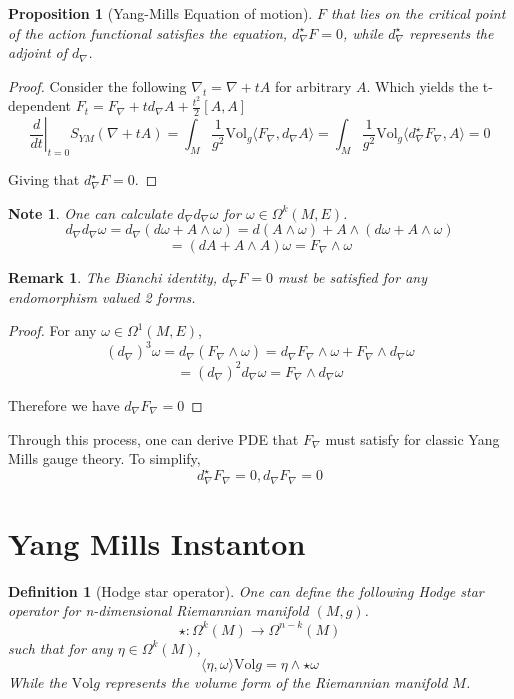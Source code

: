 \documentclass{article}
\newtheorem{defn}{Definition}
\newtheorem{prop}{Proposition}
\newtheorem{rem}{Remark}
\newtheorem{note}{Note}
\begin{document}
\begin{prop}[Yang-Mills Equation of motion]
     $F$ that lies on the critical point of the action functional satisfies the equation, $d_\nabla^{\star}F=0$, while $d_\nabla^\star$ represents the adjoint of $d_\nabla$. 
\end{prop}
\begin{proof}  
    Consider the following $\nabla_t = \nabla + tA$ for arbitrary $A$. Which yields the t-dependent $F_t = F_\nabla + t d_\nabla A + \frac{t^2}{2} [A,A]$
    \[
        \left. \frac{d}{dt} \right|_{t=0}  S_{YM}(\nabla+tA) = \int_M \frac{1}{g^2} \mathrm{Vol}_g \langle F_\nabla, d_\nabla A\rangle = \int_M \frac{1}{g^2} \mathrm{Vol}_g \langle d_\nabla ^\star F_\nabla, A\rangle =0
    \]

    Giving that $d_\nabla ^\star F = 0$.
\end{proof}


\begin{note}
    One can calculate $d_\nabla d_\nabla \omega$ for $\omega\in\Omega^k(M,E)$.
    \[
        d_\nabla d_\nabla\omega = d_\nabla(d\omega+A\wedge\omega) = d(A\wedge\omega)+A\wedge(d\omega + A\wedge\omega)
    \]
    \[
        =(dA+A\wedge A)\omega = F_\nabla \wedge \omega
    \]
\end{note}


\begin{rem}
    The Bianchi identity, $d_\nabla F = 0$ must be satisfied for any endomorphism valued 2 forms. 
\end{rem}
\begin{proof}
    For any $\omega\in\Omega^1(M,E)$,
    \[
    (d_\nabla)^3\omega = d_\nabla(F_\nabla\wedge\omega) = d_\nabla F_\nabla\wedge\omega + F_\nabla \wedge d_\nabla\omega
    \]
    \[
        =(d_\nabla)^2 d_\nabla\omega = F_\nabla \wedge d_\nabla \omega
    \]

    Therefore we have $d_\nabla F_\nabla=0$
\end{proof}

Through this process, one can derive PDE that $F_\nabla$ must satisfy for classic Yang Mills gauge theory. To simplify, 
\[
    d_\nabla^\star F_\nabla = 0, d_\nabla F_\nabla = 0
\]

\section*{Yang Mills Instanton}

\begin{defn}[Hodge star operator]
    One can define the following Hodge star operator for n-dimensional Riemannian manifold $(M,g)$.
    \[
     \star : \Omega^k(M)\longrightarrow \Omega^{n-k}(M)
    \]
    such that for any $\eta\in \Omega^k(M)$,
    \[
        \langle\eta,\omega\rangle \mathrm{Vol}g =\eta \wedge \star \omega
    \]
    While the $\mathrm{Vol}g$ represents the volume form of the Riemannian manifold $M$.
\end{defn}
\end{document}
